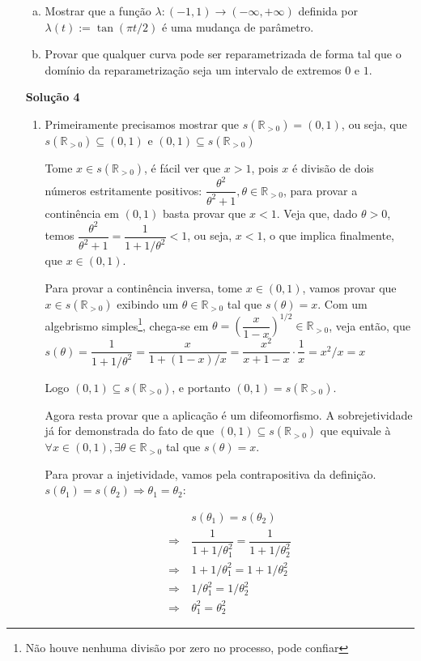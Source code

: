 \documentclass[12pt,letterpaper]{article}
\newcommand{\rpos}{\mathbb{R}_{>0}}
\newcommand{\sol}[1]{\textbf{Solução #1}}
\begin{document}
\begin{enumerate}
\begin{enumerate}[a.]
			
			
			\item Mostrar que a função $\lambda:(-1,1)\to(-\infty,+\infty)$ definida por $\lambda(t):=\tan(\pi t/2)$ é uma mudança de parâmetro.
			
			\item Provar que qualquer curva pode ser reparametrizada de forma tal que o domínio da reparametrização seja um intervalo de extremos $0$ e $1$.
		\end{enumerate}
	
	\item [\sol{4}] 
	\begin{enumerate}[\textbf{a.}]
		\item Primeiramente precisamos mostrar que $s(\rpos)=(0,1)$, ou seja, que $s(\rpos)\subseteq (0,1)$ e $(0,1)\subseteq s(\rpos)$
		
		Tome $x\in s(\rpos)$, é fácil ver que $x>1$, pois $x$ é divisão de dois números estritamente positivos: $\dfrac{\theta^2}{\theta^2+1},\theta\in\rpos$, para provar a continência em $(0,1)$ basta provar que $x<1$. Veja que, dado $\theta>0$, temos $\dfrac{\theta^2}{\theta^2+1}=\dfrac{1}{1+1/\theta^2}<1$, ou seja, $x<1$, o que implica finalmente, que $x\in(0,1)$.
		
		Para provar a continência inversa, tome $x\in(0,1)$, vamos provar que $x\in s(\rpos)$ exibindo um $\theta\in\rpos$ tal que $s(\theta)=x$. Com um algebrismo simples\footnote{Não houve nenhuma divisão por zero no processo, pode confiar}, chega-se em $\theta=\left(\dfrac{x}{1-x}\right)^{1/2}\in\rpos$, veja então, que $s(\theta)=\dfrac{1}{1+1/\theta^2}=\dfrac{x}{1+(1-x)/x}=\dfrac{x^2}{x+1-x}\cdot\dfrac1x=x^2/x=x$
		
		Logo $(0,1)\subseteq s(\rpos)$, e portanto $(0,1)= s(\rpos)$.
		
		Agora resta provar que a aplicação é um difeomorfismo. A sobrejetividade já for demonstrada do fato de que $(0,1)\subseteq s(\rpos)$ que equivale à $\forall x\in(0,1),\exists \theta\in\rpos$ tal que $s(\theta)=x$.
		
		Para provar a injetividade, vamos pela contrapositiva da definição. $s(\theta_1)=s(\theta_2)\Rightarrow\theta_1=\theta_2$:
		
		\begin{align*}
			&~s(\theta_1)=s(\theta_2)\\
			\Rightarrow&~\dfrac{1}{1+1/\theta_1^2}=\dfrac{1}{1+1/\theta_2^2}\\
			\Rightarrow&~1+1/\theta_1^2=1+1/\theta_2^2\\
			\Rightarrow&~1/\theta_1^2=1/\theta_2^2\\
			\Rightarrow&~\theta_1^2=\theta_2^2
		\end{align*}
	

\end{enumerate}
\end{enumerate}
\end{document}
